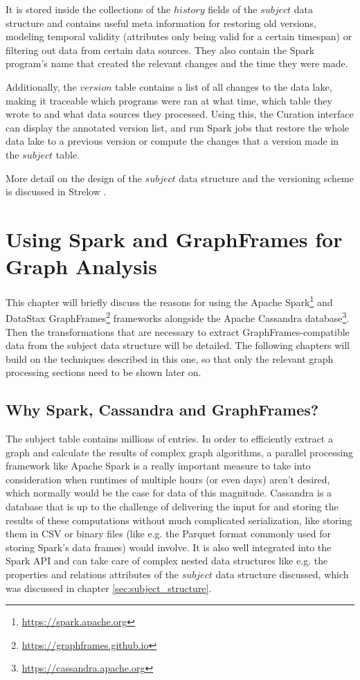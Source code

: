\documentclass[
        a4paper,     %
        titlepage,   %
        oneside,     %
        parskip      %
]{scrartcl}          %
\begin{document}
    It is stored inside the collections of the $history$ fields of the $subject$
    data structure and contains useful meta information for restoring old versions,
    modeling temporal validity (attributes only being valid for a certain timespan)
    or filtering out data from certain data sources. They also contain the Spark
    program's name that created the relevant changes and the time they were made.

    Additionally, the $version$ table contains a list of all changes to the data lake,
    making it traceable which programs were ran at what time, which table they wrote
    to and what data sources they processed. Using this, the Curation interface
    can display the annotated version list, and run Spark jobs that restore the
    whole data lake to a previous version or compute the changes that a version
    made in the $subject$ table.

    More detail on the design of the $subject$ data structure and the versioning
    scheme is discussed in Strelow \cite{strelow}.
    \pagebreak

  \section{Using Spark and GraphFrames for Graph Analysis}
  This chapter will briefly discuss the reasons for using the
  Apache Spark\footnote{\url{https://spark.apache.org}}
  and DataStax GraphFrames\footnote{\url{https://graphframes.github.io}}
  frameworks alongside the
  Apache Cassandra database\footnote{\url{https://cassandra.apache.org}}.
  Then the transformations that are necessary to extract GraphFrames-compatible
  data from the subject data structure will be detailed.
  The following chapters will build on the techniques described in this one, so
  that only the relevant graph processing sections need to be shown later on.

    \subsection{Why Spark, Cassandra and GraphFrames?}
    The subject table contains millions of entries. In order to efficiently extract
    a graph and calculate the results of complex graph algorithms, a parallel processing
    framework like Apache Spark is a really important measure to take into consideration when runtimes
    of multiple hours (or even days) aren't desired, which normally would be the case for data of this magnitude.
    Cassandra is a database that is up to the challenge of delivering the input for and storing the results of
    these computations without much complicated serialization, like storing them
    in CSV or binary files (like e.g. the Parquet format commonly used for storing Spark's data frames) would involve.
    It is also well integrated into the Spark API and can take care of complex nested
    data structures like e.g. the properties and relations attributes of the $subject$
    data structure discussed, which was discussed in chapter \ref{sec:subject_structure}.
\end{document}
